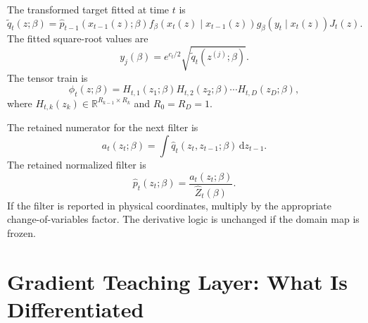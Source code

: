 \documentclass[11pt]{article}
\numberwithin{equation}{section}
\newcommand{\R}{\mathbb R}
\newcommand{\dd}{\,\mathrm d}
\begin{document}
The transformed target fitted at time \(t\) is
\begin{equation}
    \widetilde q_t(z;\beta)
    =
    \widehat p_{t-1}(x_{t-1}(z);\beta)
    f_\beta(x_t(z)\mid x_{t-1}(z))
    g_\beta(y_t\mid x_t(z))
    J_t(z).
    \label{eq:p24-p19-46}
\end{equation}
The fitted square-root values are
\begin{equation}
    y_j(\beta)
    =
    e^{c_t/2}\sqrt{\widetilde q_t(z^{(j)};\beta)}.
    \label{eq:p24-p19-47}
\end{equation}
The tensor train is
\begin{equation}
    \phi_t(z;\beta)
    =
    H_{t,1}(z_1;\beta)H_{t,2}(z_2;\beta)\cdots H_{t,D}(z_D;\beta),
    \label{eq:p24-p19-48}
\end{equation}
where \(H_{t,k}(z_k)\in\R^{R_{k-1}\times R_k}\) and \(R_0=R_D=1\).

The retained numerator for the next filter is
\begin{equation}
    a_t(z_t;\beta)
    =
    \int \widehat q_t(z_t,z_{t-1};\beta)\dd z_{t-1}.
    \label{eq:p24-p19-49}
\end{equation}
The retained normalized filter is
\begin{equation}
    \widehat p_t(z_t;\beta)
    =
    \frac{a_t(z_t;\beta)}{\widehat Z_t(\beta)}.
    \label{eq:p24-p19-50}
\end{equation}
If the filter is reported in physical coordinates, multiply by the appropriate
change-of-variables factor.  The derivative logic is unchanged if the domain
map is frozen.

\section{Gradient Teaching Layer: What Is Differentiated}
\end{document}
